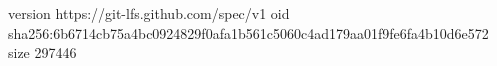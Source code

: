 version https://git-lfs.github.com/spec/v1
oid sha256:6b6714cb75a4bc0924829f0afa1b561c5060c4ad179aa01f9fe6fa4b10d6e572
size 297446

